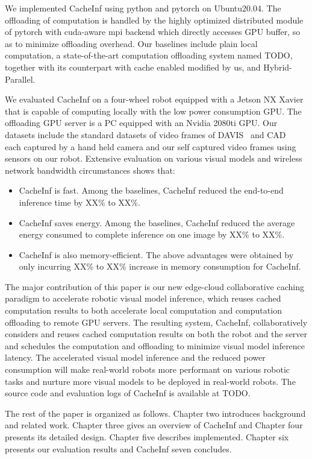 We implemented CacheInf using python and pytorch on Ubuntu20.04. 
The offloading of computation is handled by the highly optimized distributed module of pytorch with cuda-aware mpi backend which directly accesses GPU buffer, so as to minimize offloading overhead.
Our baselines include plain local computation, a state-of-the-art computation offloading system named TODO, together with its counterpart with cache enabled modified by us, and Hybrid-Parallel.

We evaluated CacheInf on a four-wheel robot equipped with a Jetson NX Xavier that is capable of computing locally with the low power consumption GPU.
The offloading GPU server is a PC equipped with an Nvidia 2080ti GPU.
Our datasets include the standard datasets of video frames of DAVIS~\cite{Perazzi2016} and CAD~\cite{Choi_VSWS_2009} each captured by a hand held camera and our self captured video frames using sensors on our robot.
Extensive evaluation on various visual models and wireless network bandwidth circumstances shows that:
\begin{itemize}
    \item CacheInf is fast. Among the baselines, CacheInf reduced the end-to-end inference time by XX\% to XX\%.
    \item CacheInf saves energy. Among the baselines, CacheInf reduced the average energy consumed to complete inference on one image by XX\% to XX\%.
    \item CacheInf is also memory-efficient. The above advantages were obtained by only incurring XX\% to XX\% increase in memory consumption for CacheInf.
\end{itemize}

The major contribution of this paper is our new edge-cloud collaborative caching paradigm to accelerate robotic visual model inference, which reuses cached computation results to both accelerate local computation and computation offloading to remote GPU servers.
The resulting system, CacheInf, collaboratively considers and reuses cached computation results on both the robot and the server and schedules the computation and offloading to minimize visual model inference latency.
The accelerated visual model inference and the reduced power consumption will make real-world robots more performant on various robotic tasks and nurture more visual models to be deployed in real-world robots.
The source code and evaluation logs of CacheInf is available at TODO.

The rest of the paper is organized as follows.
Chapter two introduces background and related work.
Chapter three gives an overview of CacheInf and Chapter four presents its detailed design.
Chapter five describes implemented.
Chapter six presents our evaluation results and CacheInf seven concludes.


